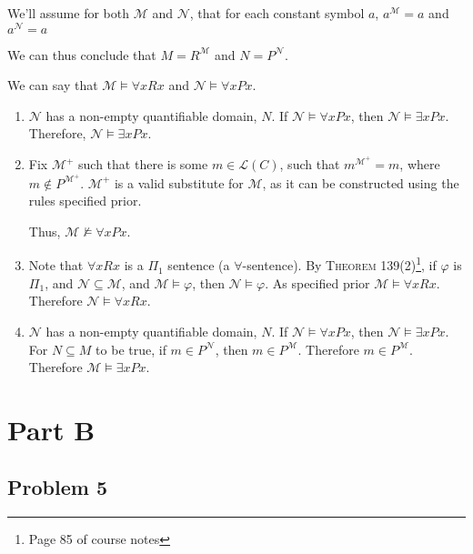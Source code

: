 \documentclass[a4paper]{article}
\newcommand{\MODEL}{\mathcal{M}}
\newcommand{\SUBMODEL}{\mathcal{N}}
\newcommand{\LANGUAGE}{\mathcal{L}}
\begin{document}
We'll assume for both $\mathcal{M}$ and $\mathcal{N}$, that for each constant symbol $a$, $a^{\mathcal{M}} = a$ and $a^{\mathcal{N}} = a$

We can thus conclude that $M = R^\mathcal{M}$ and $N = P^\mathcal{N}$.


We can say that $\mathcal{M} \models \forall x Rx$ and $\mathcal{N} \models \forall x Px$.

\begin{enumerate}

    \item $\mathcal{N}$ has a non-empty quantifiable domain, $N$. If $\mathcal{N} \models \forall x Px$, then $\mathcal{N} \models \exists x Px$. Therefore, $\mathcal{N} \models \exists x Px$.

    \item Fix $\mathcal{M^{+}}$ such that there is some $m \in $$\LANGUAGE(C)$, such that $m^\mathcal{M^{+}} = m$, where $m \not \in P^\mathcal{M^{+}}$. $\mathcal{M^{+}}$ is a valid substitute for $\MODEL$, as it can be constructed using the rules specified prior.

        Thus, $\MODEL \not \models \forall x P x$.

    \item Note that $\forall x Rx$ is a $\Pi_1$ sentence (a $\forall$-sentence). By \textsc{Theorem 139(2)}\footnote{Page 85 of course notes}, if $\varphi$ is $\Pi_1$, and $\SUBMODEL \subseteq \MODEL$, and $\mathcal{M} \models \varphi$, then $\mathcal{N} \models \varphi$. As specified prior $\mathcal{M} \models \forall x Rx$. Therefore $\mathcal{N} \models \forall x Rx$.

    \item $\mathcal{N}$ has a non-empty quantifiable domain, $N$. If $\SUBMODEL \models \forall x Px$, then $\mathcal{N} \models \exists x Px$. For $N \subseteq M$ to be true, if $m \in P^{\SUBMODEL}$, then $m \in P^{\MODEL}$. Therefore $m \in P^{\MODEL}$. Therefore $\MODEL \models \exists x Px$. 

\end{enumerate}

\section*{Part B}

\subsection*{Problem 5}
\end{document}
